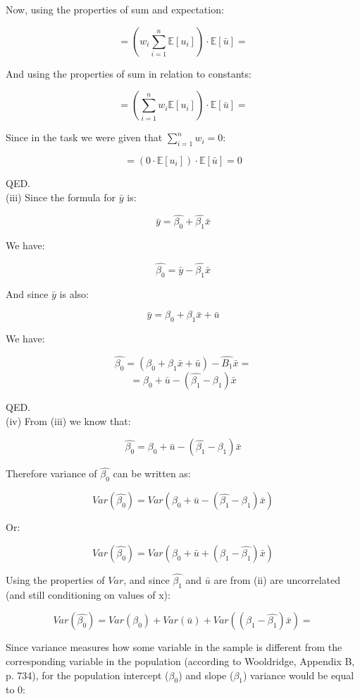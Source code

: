 \documentclass{article}
\begin{document}
Now, using the properties of sum and expectation:

$$= (w_i \sum_{i=1}^{n} \mathbb{E}[u_i]) \cdot \mathbb{E}[\bar{u}] = $$

And using the properties of sum in relation to constants:

$$= (\sum_{i=1}^{n} w_i \mathbb{E}[u_i]) \cdot \mathbb{E}[\bar{u}] = $$

Since in the task we were given that $\sum_{i=1}^{n} w_i = 0$:

$$= (0 \cdot \mathbb{E}[u_i]) \cdot \mathbb{E}[\bar{u}] = 0$$

QED. 
\\

(iii) Since the formula for $\bar{y}$ is:

$$\bar{y} = \hat{\beta_0} + \hat{\beta_1} \bar{x}$$

We have:

$$\hat{\beta_0} = \bar{y} - \hat{\beta_1} \bar{x}$$

And since $\bar{y}$ is also: 

$$\bar{y} = \beta_0 + \beta_1 \bar{x} + \bar{u}$$

We have: 

$$\hat{\beta_0} = (\beta_0 + \beta_1 \bar{x} + \bar{u}) - \hat{B_1} \bar{x}=$$
$$= \beta_0 + \bar{u} - (\hat{\beta_1} - \beta_1)\bar{x}$$

QED.
\\

(iv) From (iii) we know that:

$$\hat{\beta_0} = \beta_0 + \bar{u} - (\hat{\beta_1} - \beta_1)\bar{x}$$

Therefore variance of $\hat{\beta_0}$ can be written as:

$$Var(\hat{\beta_0}) = Var(\beta_0 + \bar{u} - (\hat{\beta_1} - \beta_1)\bar{x})$$

Or:

$$Var(\hat{\beta_0}) = Var(\beta_0 + \bar{u} + (\beta_1 - \hat{\beta_1})\bar{x})$$

Using the properties of $Var$, and since $\hat{\beta_1}$ and $\bar{u}$ are from (ii) are uncorrelated (and still conditioning on values of x):

$$Var(\hat{\beta_0}) = Var(\beta_0) + Var(\bar{u}) + Var((\beta_1 - \hat{\beta_1})\bar{x}) = $$

Since variance measures how some variable in the sample is different from the corresponding variable in the population (according to Wooldridge, Appendix B, p. 734), for the population intercept ($\beta_0$) and slope ($\beta_1$) variance would be equal to 0:
\end{document}

